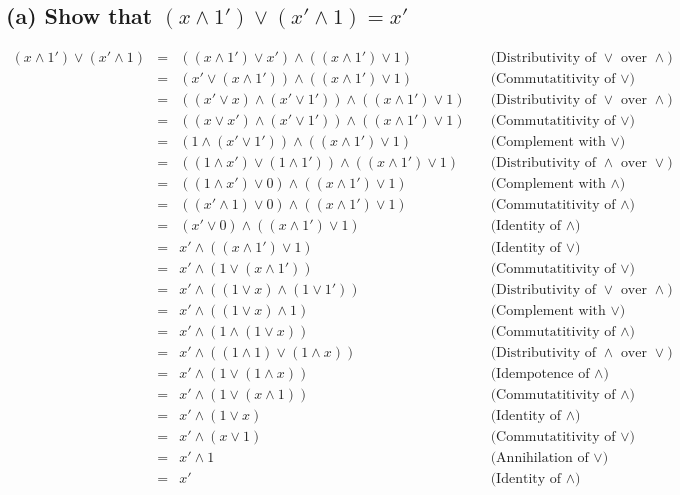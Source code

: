 \documentclass[]{article}
\begin{document}
\begin{spacing}{1.5}
		\subsection*{(a) Show that $ (x \wedge  1 ' ) \vee  (x'  \wedge  1 )=x' $}
		\[\begin{array}{rclr}
			(x \wedge  1 ' ) \vee  (x'  \wedge  1 )&=& ((x \wedge  1 ' ) \vee  x' ) \wedge  ((x \wedge  1 ' ) \vee  1 ) &\quad\text{(Distributivity of $\vee$ over $\wedge$)}\\
			&=& (x'  \vee  (x \wedge  1 ' )) \wedge  ((x \wedge  1 ' ) \vee  1 ) &\quad\text{(Commutatitivity of $\vee$)}\\
			&=& ((x'  \vee  x) \wedge  (x'  \vee  1 ' )) \wedge  ((x \wedge  1 ' ) \vee  1 ) &\quad\text{(Distributivity of $\vee$ over $\wedge$)}\\
			&=& ((x \vee  x' ) \wedge  (x'  \vee  1 ' )) \wedge  ((x \wedge  1 ' ) \vee  1 ) &\quad\text{(Commutatitivity of $\vee$)}\\
			&=& (1  \wedge  (x'  \vee  1 ' )) \wedge  ((x \wedge  1 ' ) \vee  1 ) &\quad\text{(Complement with $\vee$)}\\
			&=& ((1  \wedge  x' ) \vee  (1  \wedge  1 ' )) \wedge  ((x \wedge  1 ' ) \vee  1 ) &\quad\text{(Distributivity of $\wedge$ over $\vee$)}\\
			&=& ((1  \wedge  x' ) \vee  0 ) \wedge  ((x \wedge  1 ' ) \vee  1 ) &\quad\text{(Complement with $\wedge$)}\\
			&=& ((x'  \wedge  1 ) \vee  0 ) \wedge  ((x \wedge  1 ' ) \vee  1 ) &\quad\text{(Commutatitivity of $\wedge$)}\\
			&=& (x'  \vee  0 ) \wedge  ((x \wedge  1 ' ) \vee  1 ) &\quad\text{(Identity of $\wedge$)}\\
			&=& x'  \wedge  ((x \wedge  1 ' ) \vee  1 ) &\quad\text{(Identity of $\vee$)}\\
			&=& x'  \wedge  (1  \vee  (x \wedge  1 ' )) &\quad\text{(Commutatitivity of $\vee$)}\\
			&=& x'  \wedge  ((1  \vee  x) \wedge  (1  \vee  1 ' )) &\quad\text{(Distributivity of $\vee$ over $\wedge$)}\\
			&=& x'  \wedge  ((1  \vee  x) \wedge  1 ) &\quad\text{(Complement with $\vee$)}\\
			&=& x'  \wedge  (1  \wedge  (1  \vee  x)) &\quad\text{(Commutatitivity of $\wedge$)}\\
			&=& x'  \wedge  ((1  \wedge  1 ) \vee  (1  \wedge  x)) &\quad\text{(Distributivity of $\wedge$ over $\vee$)}\\
			&=& x'  \wedge  (1  \vee  (1  \wedge  x)) &\quad\text{(Idempotence of $\wedge$)}\\
			&=& x'  \wedge  (1  \vee  (x \wedge  1 )) &\quad\text{(Commutatitivity of $\wedge$)}\\
			&=& x'  \wedge  (1  \vee  x) &\quad\text{(Identity of $\wedge$)}\\
			&=& x'  \wedge  (x \vee  1 ) &\quad\text{(Commutatitivity of $\vee$)}\\
			&=& x'  \wedge  1  &\quad\text{(Annihilation of $\vee$)}\\
			&=& x'  &\quad\text{(Identity of $\wedge$)}
		\end{array}\]
	

\end{spacing}
\end{document}

